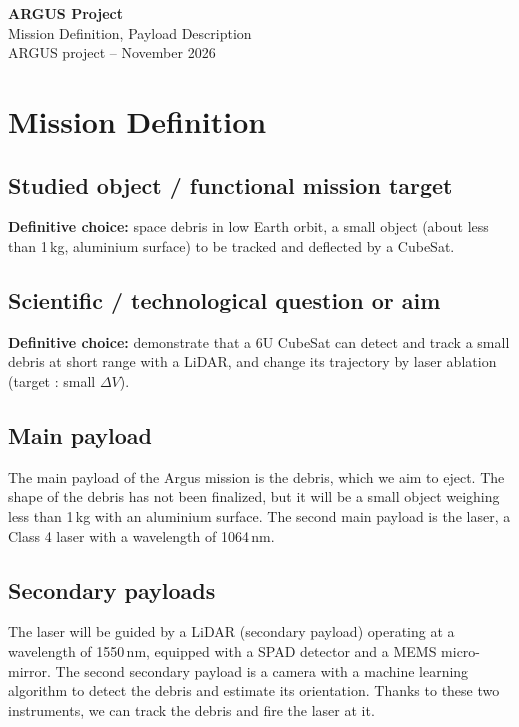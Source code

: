 \documentclass[11pt,a4paper]{article}
\begin{document}
\begin{center}
{\Large \textbf{ARGUS Project}}\\[0.3em]
{\large Mission Definition, Payload Description}\\[0.5em]
ARGUS project -- November 2026
\end{center}

\small
\tableofcontents
\normalsize

\section{Mission Definition}

\subsection{Studied object / functional mission target}
\textbf{Definitive choice:} space debris in low Earth orbit, a small object (about  less than 1\,kg, aluminium surface) to be tracked and deflected by a CubeSat.

\subsection{Scientific / technological question or aim}
\textbf{Definitive choice:} demonstrate that a 6U CubeSat can detect and track a small debris at short range with a LiDAR, and change its trajectory by laser ablation (target : small $\Delta V$).


\subsection{Main payload}
The main payload of the Argus mission is the debris, which we aim to eject.
The shape of the debris has not been finalized, but it will be a small object weighing less than 1\,kg with an aluminium surface.
The second main payload is the laser, a Class 4 laser with a wavelength of 1064\,nm.

\subsection{Secondary payloads}
The laser will be guided by a LiDAR (secondary payload) operating at a wavelength of 1550\,nm, equipped with a SPAD detector and a MEMS micro-mirror.
The second secondary payload is a camera with a machine learning algorithm to detect the debris and estimate its orientation.
Thanks to these two instruments, we can track the debris and fire the laser at it.
\end{document}
